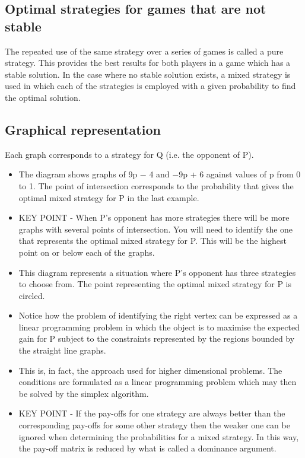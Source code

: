 \documentclass[]{report}
\begin{document}
\subsection{Optimal strategies for games that are not stable}
The repeated use of the same strategy over a series of games is called a pure strategy. This provides the best results for both players in a game which has a stable solution. In the case where no stable solution exists, a mixed strategy is used in which each of the strategies is employed with a given probability to find the optimal solution.


 

\subsection{Graphical representation}
Each graph corresponds to a strategy for Q (i.e. the opponent of P).

\begin{itemize}
\item The diagram shows graphs of 9p − 4 and −9p + 6 against values of p from 0 to 1.
The point of intersection corresponds to the probability that gives the optimal mixed strategy for P in the last example.
\item 
KEY POINT - When P’s opponent has more strategies there will be more graphs with several points of intersection. You will need to identify the one that represents the optimal mixed strategy for P. This will be the highest point on or below each of the graphs.
\item 
This diagram represents a situation where P’s opponent has three strategies to choose from.
The point representing the optimal mixed strategy for P is circled.
\item 
Notice how the problem of identifying the right vertex can be expressed as a linear programming problem in which the object is to maximise the expected gain for P subject to the constraints represented by the regions bounded by the straight line graphs.
\item 
This is, in fact, the approach used for higher dimensional problems. The conditions are formulated as a linear programming problem which may then be solved by the
simplex algorithm.
\item 
KEY POINT - If the pay-offs for one strategy are always better than the corresponding pay-offs for some other strategy then the weaker one can be ignored when determining the probabilities for a mixed strategy. In this way, the pay-off matrix is reduced by what is called a dominance argument.
\end{itemize}
\end{document}
